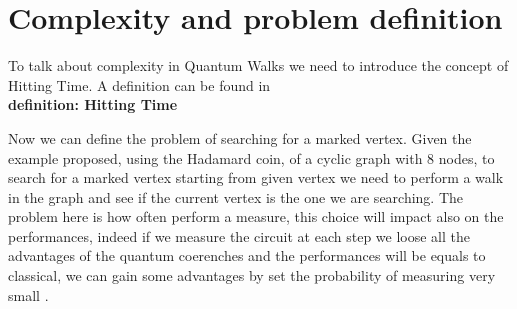 \section{Complexity and problem definition}

To talk about complexity in Quantum Walks we need to introduce the concept of Hitting Time. A definition can be found in \cite{6812670}
\\
\textbf{definition: Hitting Time}  



Now we can define the problem of searching for a marked vertex. Given the example proposed, using the Hadamard coin, of a 
cyclic graph with 8 nodes, to search for a marked vertex starting from given vertex we need to perform a walk in the graph 
and see if the current vertex is the one we are searching. The problem here is how often perform a measure, this choice
will impact also on the performances, indeed if we measure the circuit at each step we loose all the advantages of the quantum
coerenches and the performances will be equals to classical, we can gain some advantages by set the probability of measuring
very small \cite{Kempe_2003}.    